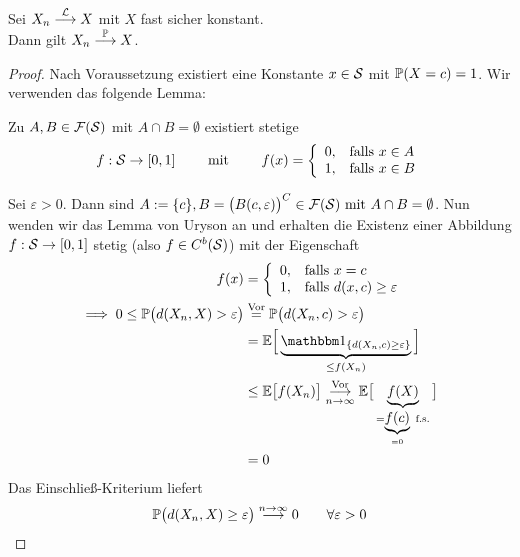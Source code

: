 \begin{satz}\label{satz4.13}
Sei $X_n\stackrel{\L}{\longrightarrow}X$ mit $X$ fast sicher konstant.\\
Dann gilt $X_n\stackrel{\P}{\longrightarrow} X$.
\end{satz}
\begin{proof}
Nach Voraussetzung existiert eine Konstante $x\in\S$ mit $\P(X=c)=1$. Wir verwenden das folgende Lemma:

\begin{lem}\enter\label{lemmaVonUryson}
Zu $A,B\in\F(\S)$ mit $A\cap B=\emptyset$ existiert stetige 
\begin{align*}
f:\S\to[0,1]\qquad\mit\qquad f(x)=\left\lbrace\begin{array}{cl}
0, &\falls x\in A\\
1, &\falls x\in B
\end{array}\right.
\end{align*}
\end{lem}
Sei $\varepsilon>0$. Dann sind $A:=\lbrace c\rbrace, B=\big(B(c,\varepsilon)\big)^C\in\F(\S)\mit A\cap B=\emptyset$. Nun wenden wir das Lemma von Uryson an und erhalten die Existenz einer Abbildung $f:\S\to[0,1]$ stetig (also $f\in C^b(\S)$) mit der Eigenschaft
\begin{align*}
f(x)&=\left\lbrace\begin{array}{cl}
0, &\falls x=c\\
1, &\falls d(x,c)\geq\varepsilon
\end{array}\right.\\
\implies 0 \leq \P\big(d(X_n,X)>\varepsilon\big)
&\stackeq{\text{Vor}}
\P\big(d(X_n,c)>\varepsilon\big)\\
&=\E\Big[\underbrace{\indi_{\lbrace d(X_n,c)\geq\varepsilon\rbrace}}_{\leq f(X_n)}\Big]\\
&\leq\E\big[f(X_n)\big]\stackrelnew{n\to\infty}{\text{Vor}}{\longrightarrow}\E\big[\underbrace{f(X)}_{=\underbrace{f(c)}_{=0}\text{ f.s.}}\big]\\
&=0
\end{align*}
Das Einschließ-Kriterium liefert
\begin{align*}
\P\big(d(X_n,X)\geq\varepsilon\big)\stackrel{n\to\infty}{\longrightarrow}0\qquad\forall\varepsilon>0
\end{align*}
\end{proof}

